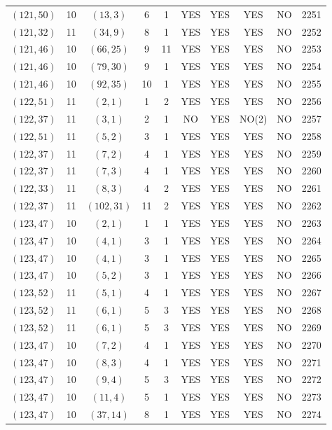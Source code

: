 \begin{longtable}{|c|c|c|c|c|c|c|c|c|c|}
$(121, 50)$ & 10 & $(13, 3)$ & 6 & 1 & YES & YES & YES & NO & 2251\\
$(121, 32)$ & 11 & $(34, 9)$ & 8 & 1 & YES & YES & YES & NO & 2252\\
$(121, 46)$ & 10 & $(66, 25)$ & 9 & 11 & YES & YES & YES & NO & 2253\\
$(121, 46)$ & 10 & $(79, 30)$ & 9 & 1 & YES & YES & YES & NO & 2254\\
$(121, 46)$ & 10 & $(92, 35)$ & 10 & 1 & YES & YES & YES & NO & 2255\\
$(122, 51)$ & 11 & $(2, 1)$ & 1 & 2 & YES & YES & YES & NO & 2256\\
$(122, 37)$ & 11 & $(3, 1)$ & 2 & 1 & NO & YES & NO(2) & NO & 2257\\
$(122, 51)$ & 11 & $(5, 2)$ & 3 & 1 & YES & YES & YES & NO & 2258\\
$(122, 37)$ & 11 & $(7, 2)$ & 4 & 1 & YES & YES & YES & NO & 2259\\
$(122, 37)$ & 11 & $(7, 3)$ & 4 & 1 & YES & YES & YES & NO & 2260\\
$(122, 33)$ & 11 & $(8, 3)$ & 4 & 2 & YES & YES & YES & NO & 2261\\
$(122, 37)$ & 11 & $(102, 31)$ & 11 & 2 & YES & YES & YES & NO & 2262\\
$(123, 47)$ & 10 & $(2, 1)$ & 1 & 1 & YES & YES & YES & NO & 2263\\
$(123, 47)$ & 10 & $(4, 1)$ & 3 & 1 & YES & YES & YES & NO & 2264\\
$(123, 47)$ & 10 & $(4, 1)$ & 3 & 1 & YES & YES & YES & NO & 2265\\
$(123, 47)$ & 10 & $(5, 2)$ & 3 & 1 & YES & YES & YES & NO & 2266\\
$(123, 52)$ & 11 & $(5, 1)$ & 4 & 1 & YES & YES & YES & NO & 2267\\
$(123, 52)$ & 11 & $(6, 1)$ & 5 & 3 & YES & YES & YES & NO & 2268\\
$(123, 52)$ & 11 & $(6, 1)$ & 5 & 3 & YES & YES & YES & NO & 2269\\
$(123, 47)$ & 10 & $(7, 2)$ & 4 & 1 & YES & YES & YES & NO & 2270\\
$(123, 47)$ & 10 & $(8, 3)$ & 4 & 1 & YES & YES & YES & NO & 2271\\
$(123, 47)$ & 10 & $(9, 4)$ & 5 & 3 & YES & YES & YES & NO & 2272\\
$(123, 47)$ & 10 & $(11, 4)$ & 5 & 1 & YES & YES & YES & NO & 2273\\
$(123, 47)$ & 10 & $(37, 14)$ & 8 & 1 & YES & YES & YES & NO & 2274\\

\end{longtable}
